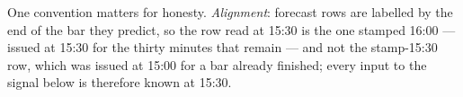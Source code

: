 One convention matters for honesty. \emph{Alignment}: forecast rows
are labelled by the end of the bar they predict, so the row read at
15:30 is the one stamped 16:00 --- issued at 15:30 for the thirty
minutes that remain --- and not the stamp-15:30 row, which was issued
at 15:00 for a bar already finished; every input to the signal below
is therefore known at 15:30.

